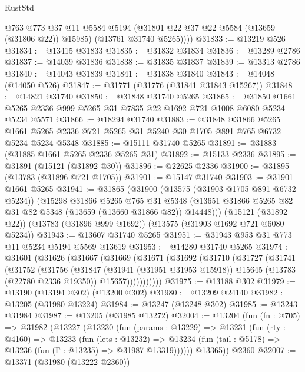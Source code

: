 \begin{lexlean}{RustStd}
\begin{coremodule}
          @763
          @773
          @37
          @11
          @5584
          @5194
          (@31801 @22 @37 @22 @5584 (@13659 (@31806 @22)) @15985)
          (@13761 @31740 @5265))))
@31833 := @13219 @526
@31834 := @13415 @31833
@31835 := @31832 @31834
@31836 := @13289 @2786
@31837 := @14039 @31836
@31838 := @31835 @31837
@31839 := @13313 @2786
@31840 := @14043 @31839
@31841 := @31838 @31840
@31843 := @14048 (@14050 @526)
@31847 := @31771 (@31776 (@31841 @31843 @15267))
@31848 := @14821 @31740
@31850 := @31848 @31740 @5265
@31865 := @31850 @1661 @5265 @2336 @999 @5265 @31 @7835 @22 @1692 @721 @1008 @6080 @5234 @5234 @5571
@31866 := @18294 @31740
@31883 := @31848
    @31866
    @5265
    @1661
    @5265
    @2336
    @721
    @5265
    @31
    @5240
    @30
    @1705
    @891
    @765
    @6732
    @5234
    @5234
    @5348
@31885 := @15111 @31740 @5265
@31891 := @31883 (@31885 @1661 @5265 @2336 @5265 @31)
@31892 := @15133 @2336
@31895 := @31891 (@15121 (@31892 @30))
@31896 := @22625 @2336
@31900 := @31895 (@13783 (@31896 @721 @1705))
@31901 := @15147 @31740
@31903 := @31901 @1661 @5265
@31941 := @31865
    (@31900
      (@13575 (@31903 @1705 @891 @6732 @5234))
      (@15298
        @31866
        @5265
        @765
        @31
        @5348
        (@13651 @31866 @5265 @82 @31 @82 @5348 (@13659 (@13660 @31866 @82)) @14448)))
    (@15121 (@31892 @22))
    (@13783 (@31896 @999 @1692))
    (@13575 (@31903 @1692 @721 @6080 @5234))
@31943 := @13607 @31740 @5265
@31951 := @31943 @953 @31 @773 @11 @5234 @5194 @5569 @13619
@31953 := @14280 @31740 @5265
@31974 := @31601
    (@31626
      (@31667
        (@31669
          (@31671
            (@31692
              (@31710
                (@31727
                  (@31741
                    (@31752
                      (@31756
                        (@31847
                          (@31941 (@31951 @31953 @15918))
                          @15645
                          (@13783 (@22780 @2336 @19350))
                          @15657)))))))))))
@31975 := @13188 @302
@31979 := @13190 (@13194 @302) (@13200 @302)
@31980 := @13209 @24140
@31982 := @13205 (@31980 @13224)
@31984 := @13247 (@13248 @302)
@31985 := @13243 @31984
@31987 := @13205 (@31985 @13272)
@32004 := @13204
    (fun (fn : @705) =>
    @31982
      (@13227
        (@13230
          (fun (params : @13229) =>
          @13231
            (fun (rty : @4160) =>
            @13233
              (fun (lets : @13232) =>
              @13234 (fun (tail : @5178) => @13236 (fun (Γ : @13235) => @31987 @13319))))))
        @13365))
    @2360
@32007 := @13371 (@31980 (@13222 @2360))

\end{coremodule}
\end{lexlean}
